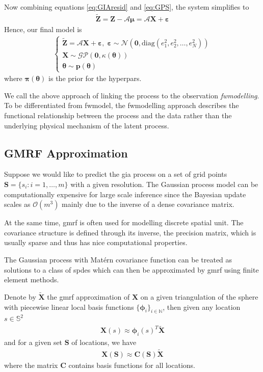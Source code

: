 \documentclass[a4paper,12pt]{article}
\begin{document}
Now combining equations \eqref{eq:GIAresid} and \eqref{eq:GPS}, the system simplifies to
\begin{align}
\bm{\tilde{Z}} = \bm{Z} - \bm{\mathcal{A}}\bm{\mu}= \bm{\mathcal{A}}\bm{X} + \bm{\varepsilon}
\end{align}
Hence, our final model is
\begin{align}
\left\{ \begin{array}{l}
\bm{\tilde{Z}} = \bm{\mathcal{A}}\bm{X} + \bm{\varepsilon}, \; 
\bm{\varepsilon} \sim \mathcal{N} (\bm{0}, \mbox{diag}(e_1^2, e_2^2, \dots, e_N^2)) \\
\bm{X} \sim \mathcal{GP}(\bm{0}, \kappa(\bm{\theta})) \\
\bm{\theta} \sim \bm{p}(\bm{\theta})
\end{array} \right.
\end{align}
where $\bm{\pi}(\bm{\theta})$ is the \gls{prior} for the \gls{hyperpars}.

We call the above approach of linking the process to the observation \emph{\gls{fwmodelling}}. To be differentiated from \gls{fwmodel}, the \gls{fwmodelling} approach describes the functional relationship between the process and the data rather than the underlying physical mechanism of the latent process.

\subsection{GMRF Approximation}
Suppose we would like to predict the \acrshort{gia} process on a set of grid points $\bm{S} = \{s_i: i = 1,\dots, m\}$ with a given resolution. The Gaussian process model can be computationally expensive for large scale inference since the Bayesian update scales as $\mathcal{O}(m^3)$ mainly due to the inverse of a dense covariance matrix. 

At the same time, \acrlong{gmrf} is often used for modelling discrete spatial unit. The covariance structure is defined through its inverse, the precision matrix, which is usually sparse and thus has nice computational properties.

The Gaussian process with Mat\'{e}rn covariance function can be treated as solutions to a class of \acrlong{spde}s \citep{Lindgren2011} which can then be approximated by \acrshort{gmrf} using finite element methods. 

Denote by $\bm{\tilde{X}}$ the \acrshort{gmrf} approximation of $\bm{X}$ on a given triangulation of the sphere with piecewise linear local basis functions $\{ \bm{\phi}_i \}_{i \in \mathbb{N}}$, then given any location $s \in \mathbb{S}^2$
\begin{align}
\bm{X}(s) \approx \bm{\phi}_i(s)^T\bm{\tilde{X}}
\end{align}
and for a given set $\bm{S}$ of locations, we have  
\begin{align}
\bm{X}(\bm{S}) \approx \bm{C}(\bm{S})\bm{\tilde{X}}
\end{align}
where the matrix $\bm{C}$ contains basis functions for all locations.
\end{document}
